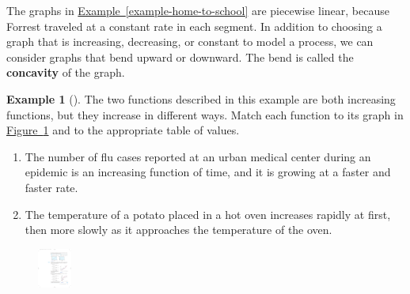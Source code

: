 \documentclass[10pt,]{book}
\newcommand{\terminology}[1]{\textbf{#1}}
\theoremstyle{plain}
\theoremstyle{definition}
\theoremstyle{definition}
\theoremstyle{definition}
\newtheorem{example}[theorem]{Example}
\theoremstyle{definition}
\theoremstyle{definition}
\numberwithin{equation}{section}
\newcommand{\hrulethin}  {\noalign{\hrule height 0.04em}}
\newcommand{\hrulethick} {\noalign{\hrule height 0.11em}}
\newcounter{figstack}
\newcounter{figindex}
\newlength\fight
\newcommand\pushValignCaptionBottom[5][b]{%
\stepcounter{figstack}%
\expandafter\def\csname %
figalign\romannumeral\value{figstack}\endcsname{#1}%
\expandafter\def\csname %
figtype\romannumeral\value{figstack}\endcsname{#2}%
\expandafter\def\csname %
figwd\romannumeral\value{figstack}\endcsname{#3}%
\expandafter\def\csname %
figcontent\romannumeral\value{figstack}\endcsname{#4}%
\expandafter\def\csname %
figcap\romannumeral\value{figstack}\endcsname{#5}%
\setbox0=\hbox{%
\begin{#2}{#3}#4\end{#2}}%
\ifdim\dimexpr\ht0+\dp0\relax>\fight\global\setlength{\fight}{%
\dimexpr\ht0+\dp0\relax}\fi%
}
\newcommand\popValignCaptionBottom{%
\setcounter{figindex}{0}%
\hfill%
\whiledo{\value{figindex}<\value{figstack}}{%
\stepcounter{figindex}%
\def\tmp{\csname figwd\romannumeral\value{figindex}\endcsname}%
\begin{\csname figtype\romannumeral\value{figindex}\endcsname}[t]{\tmp}%
\centering%
\stackinset{c}{}%
{\csname figalign\romannumeral\value{figindex}\endcsname}{}%
{\csname figcontent\romannumeral\value{figindex}\endcsname}%
{\rule{0pt}{\fight}}\par%
\csname figcap\romannumeral\value{figindex}\endcsname%
\end{\csname figtype\romannumeral\value{figindex}\endcsname}%
\hfill%
}%
\setcounter{figstack}{0}%
\setlength{\fight}{0pt}%
\hfill%
}
\begin{document}
    The graphs in \hyperref[example-home-to-school]{Example~\ref{example-home-to-school}} are piecewise linear, because Forrest traveled at a constant rate in each segment. In addition to choosing a graph that is increasing, decreasing, or constant to model a process, we can consider graphs that bend upward or downward. The bend is called the \terminology{concavity} of the graph.
%
\begin{example}[]\label{concavity}
The two functions described in this example are both increasing functions, but they increase in different ways. Match each function to its graph in \hyperref[fig-concavity]{Figure~\ref{fig-concavity}} and to the appropriate table of values.%
\leavevmode%
\begin{enumerate}[label=*\alph**]
\item\hypertarget{li-323}{}The number of flu cases reported at an urban medical center during an epidemic is an increasing function of time, and it is growing at a faster and faster rate.\item\hypertarget{li-324}{}The temperature of a potato placed in a hot oven increases rapidly at first, then more slowly as it approaches the temperature of the oven.\end{enumerate}
\leavevmode%
\leavevmode%
\begin{figure}
\centering
\includegraphics[width=0.100\textwidth,]{images/fig-concavity.pdf}\caption{\label{fig-concavity}}

\end{figure}
\end{example}
\end{document}
